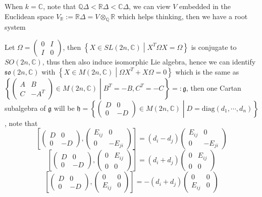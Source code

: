\documentclass[main]{subfiles}
\begin{document}
\begin{remark}
When $k=\mathbb C$, note that $\mathbb Q\Delta<\mathbb R\Delta<\mathbb C\Delta$, we can view $V$ embedded in the Euclidean space $V_{\mathbb R}:=\mathbb R\Delta=V\otimes_{\mathbb Q}\mathbb R$ which helps thinking, then we have a root system
\end{remark}

\begin{example}
Let $\Omega=\begin{pmatrix}
0&I \\
I&0
\end{pmatrix}$, then $\left\{X\in SL(2n,\mathbb C)\middle|X^T\Omega X=\Omega\right\}$ is conjugate to $SO(2n,\mathbb C)$, thus then also induce isomorphic Lie algebra, hence we can identify $\mathfrak{so}(2n,\mathbb C)$ with $\left\{X\in M(2n,\mathbb C)\middle|\Omega X^T+X\Omega=0\right\}$ which is the same as $\left\{\begin{pmatrix}
A&B \\
C&-A^T
\end{pmatrix}\in M(2n,\mathbb C)\middle| B^T=-B,C^T=-C\right\}=:\mathfrak{g}$, then one Cartan subalgebra of $\mathfrak{g}$ will be $\mathfrak{h}=\left\{\begin{pmatrix}
D&0 \\
0&-D
\end{pmatrix}\in M(2n,\mathbb C)\middle| D=\mathrm{diag}(d_1,\cdots,d_n)\right\}$, note that $$\left[\begin{pmatrix}
D&0 \\
0&-D
\end{pmatrix},\begin{pmatrix}
E_{ij}&0 \\
0&-E_{ji}
\end{pmatrix}\right]=(d_i-d_j)\begin{pmatrix}
E_{ij}&0 \\
0&-E_{ji}
\end{pmatrix}$$ $$\left[\begin{pmatrix}
D&0 \\
0&-D
\end{pmatrix},\begin{pmatrix}
0&E_{ij} \\
0&0
\end{pmatrix}\right]=(d_i+d_j)\begin{pmatrix}
0&E_{ij} \\
0&0
\end{pmatrix}$$ $$\left[\begin{pmatrix}
D&0 \\
0&-D
\end{pmatrix},\begin{pmatrix}
0&0 \\
E_{ij}&0
\end{pmatrix}\right]=-(d_i+d_j)\begin{pmatrix}
0&0 \\
E_{ij}&0
\end{pmatrix}$$
\end{example}
\end{document}
